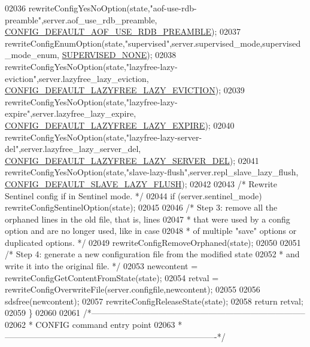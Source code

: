 \begin{DoxyCode}
{{{{{{{{{{{{{{{{{{{{{{{{{{{{02036     rewriteConfigYesNoOption(state,\textcolor{stringliteral}{"aof-use-rdb-preamble"},server.aof\_use\_rdb\_preamble,
      \hyperlink{server_8h_a938328826b94d0e9bd07b225767cad43}{CONFIG\_DEFAULT\_AOF\_USE\_RDB\_PREAMBLE});
02037     rewriteConfigEnumOption(state,\textcolor{stringliteral}{"supervised"},server.supervised\_mode,supervised\_mode\_enum,
      \hyperlink{server_8h_a2a0d6ba64b419357e52a6473f48bc882}{SUPERVISED\_NONE});
02038     rewriteConfigYesNoOption(state,\textcolor{stringliteral}{"lazyfree-lazy-eviction"},server.lazyfree\_lazy\_eviction,
      \hyperlink{server_8h_aa6529c6ba7143b1ec4aa15d8a96b2154}{CONFIG\_DEFAULT\_LAZYFREE\_LAZY\_EVICTION});
02039     rewriteConfigYesNoOption(state,\textcolor{stringliteral}{"lazyfree-lazy-expire"},server.lazyfree\_lazy\_expire,
      \hyperlink{server_8h_a2e6080731ab6e81b19f1bfedf7b298f9}{CONFIG\_DEFAULT\_LAZYFREE\_LAZY\_EXPIRE});
02040     rewriteConfigYesNoOption(state,\textcolor{stringliteral}{"lazyfree-lazy-server-del"},server.lazyfree\_lazy\_server\_del,
      \hyperlink{server_8h_ac1f765315b576de4c0ea2beb7e37ae02}{CONFIG\_DEFAULT\_LAZYFREE\_LAZY\_SERVER\_DEL});
02041     rewriteConfigYesNoOption(state,\textcolor{stringliteral}{"slave-lazy-flush"},server.repl\_slave\_lazy\_flush,
      \hyperlink{server_8h_ace54c14c3b13acbf1d7a6d6e893cdfd3}{CONFIG\_DEFAULT\_SLAVE\_LAZY\_FLUSH});
02042 
02043     \textcolor{comment}{/* Rewrite Sentinel config if in Sentinel mode. */}
02044     \textcolor{keywordflow}{if} (server.sentinel\_mode) rewriteConfigSentinelOption(state);
02045 
02046     \textcolor{comment}{/* Step 3: remove all the orphaned lines in the old file, that is, lines}
02047 \textcolor{comment}{     * that were used by a config option and are no longer used, like in case}
02048 \textcolor{comment}{     * of multiple "save" options or duplicated options. */}
02049     rewriteConfigRemoveOrphaned(state);
02050 
02051     \textcolor{comment}{/* Step 4: generate a new configuration file from the modified state}
02052 \textcolor{comment}{     * and write it into the original file. */}
02053     newcontent = rewriteConfigGetContentFromState(state);
02054     retval = rewriteConfigOverwriteFile(server.configfile,newcontent);
02055 
02056     sdsfree(newcontent);
02057     rewriteConfigReleaseState(state);
02058     \textcolor{keywordflow}{return} retval;
02059 \}
02060 
02061 \textcolor{comment}{/*-----------------------------------------------------------------------------}
02062 \textcolor{comment}{ * CONFIG command entry point}
02063 \textcolor{comment}{ *----------------------------------------------------------------------------*/}
}}}}}}}}}}}}}}}}}}}}}}}}}}}}
\end{DoxyCode}
